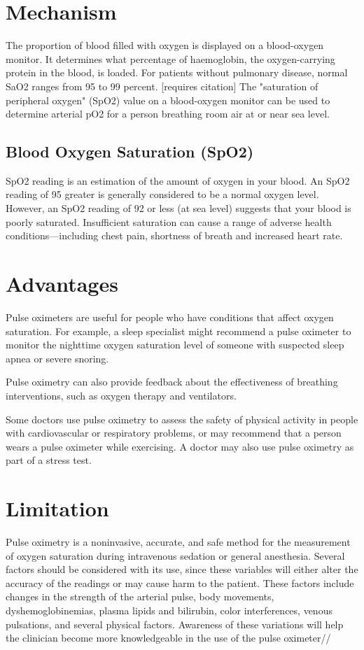 \documentclass[11pt]{article}
\begin{document}
\section{Mechanism}
The proportion of blood filled with oxygen is displayed on a blood-oxygen monitor. It determines what percentage of haemoglobin, the oxygen-carrying protein in the blood, is loaded. For patients without pulmonary disease, normal SaO2 ranges from 95 to 99 percent. [requires citation] The "saturation of peripheral oxygen" (SpO2) value on a blood-oxygen monitor can be used to determine arterial pO2 for a person breathing room air at or near sea level.


\subsection{Blood Oxygen Saturation (SpO2)}
SpO2 reading is an estimation of the amount of oxygen in your blood. An SpO2 reading of 95 greater is generally considered to be a normal oxygen level. However, an SpO2 reading of 92 or less (at sea level) suggests that your blood is poorly saturated. Insufficient saturation can cause a range of adverse health conditions—including chest pain, shortness of breath and increased heart rate.
\section*{Advantages}
Pulse oximeters are useful for people who have conditions that affect oxygen saturation. For example, a sleep specialist might recommend a pulse oximeter to monitor the nighttime oxygen saturation level of someone with suspected sleep apnea or severe snoring.

Pulse oximetry can also provide feedback about the effectiveness of breathing interventions, such as oxygen therapy and ventilators.

Some doctors use pulse oximetry to assess the safety of physical activity in people with cardiovascular or respiratory problems, or may recommend that a person wears a pulse oximeter while exercising. A doctor may also use pulse oximetry as part of a stress test.


\section*{Limitation}
Pulse oximetry is a noninvasive, accurate, and safe method for the measurement of oxygen saturation during intravenous sedation or general anesthesia. Several factors should be considered with its use, since these variables will either alter the accuracy of the readings or may cause harm to the patient. These factors include changes in the strength of the arterial pulse, body movements, dyshemoglobinemias, plasma lipids and bilirubin, color interferences, venous pulsations, and several physical factors. Awareness of these variations will help the clinician become more knowledgeable in the use of the pulse oximeter//
\end{document}
